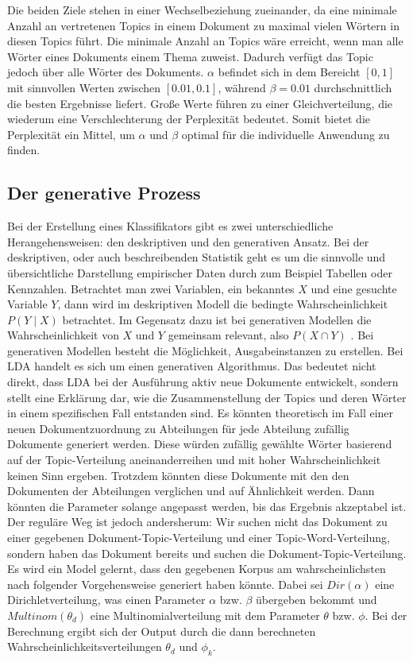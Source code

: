 \documentclass[german,version-2020-11]{uzl-thesis}
\begin{document}
Die beiden Ziele stehen in einer Wechselbeziehung zueinander, da eine minimale Anzahl an vertretenen Topics in einem Dokument zu maximal vielen Wörtern in diesen Topics führt. Die minimale Anzahl an Topics wäre erreicht, wenn man alle Wörter eines Dokuments einem Thema zuweist. Dadurch verfügt das Topic jedoch über alle Wörter des Dokuments. $\alpha$ befindet sich in dem Bereicht $[0,1]$ mit sinnvollen Werten zwischen $[0.01, 0.1]$, während $\beta =0.01$ durchschnittlich die besten Ergebnisse liefert. Große Werte führen zu einer Gleichverteilung, die wiederum eine Verschlechterung der Perplexität bedeutet. Somit bietet die Perplexität ein Mittel, um $\alpha$ und $\beta$ optimal für die individuelle Anwendung zu finden. \\



\subsection{Der generative Prozess} 
Bei der Erstellung eines Klassifikators gibt es zwei unterschiedliche Herangehensweisen: den deskriptiven und den generativen Ansatz. Bei der deskriptiven, oder auch beschreibenden Statistik geht es um die sinnvolle und übersichtliche Darstellung empirischer Daten durch zum Beispiel Tabellen oder Kennzahlen. Betrachtet man zwei Variablen, ein bekanntes $X$ und eine gesuchte Variable $Y$, dann wird im deskriptiven Modell die bedingte Wahrscheinlichkeit $P(Y \mid X)$ betrachtet. Im Gegensatz dazu ist bei generativen Modellen die Wahrscheinlichkeit von $X$ und $Y$ gemeinsam relevant, also $P(X \cap Y)$ . Bei generativen Modellen besteht die Möglichkeit, Ausgabeinstanzen zu erstellen. Bei LDA handelt es sich um einen generativen Algorithmus. Das bedeutet nicht direkt, dass LDA bei der Ausführung aktiv neue Dokumente entwickelt, sondern stellt eine Erklärung dar, wie die Zusammenstellung der Topics und deren Wörter in einem spezifischen Fall entstanden sind. Es könnten theoretisch im Fall einer neuen Dokumentzuordnung zu Abteilungen für jede Abteilung zufällig Dokumente generiert werden. Diese würden zufällig gewählte Wörter basierend auf der Topic-Verteilung aneinanderreihen und mit hoher Wahrscheinlichkeit keinen Sinn ergeben. Trotzdem könnten diese Dokumente mit den den Dokumenten der Abteilungen verglichen und auf Ähnlichkeit werden. Dann könnten die Parameter solange angepasst werden, bis das Ergebnis akzeptabel ist. Der reguläre Weg ist jedoch andersherum: Wir suchen nicht das Dokument zu einer gegebenen Dokument-Topic-Verteilung und einer Topic-Word-Verteilung, sondern haben das Dokument bereits und suchen die Dokument-Topic-Verteilung. Es wird ein Model gelernt, dass den gegebenen Korpus am wahrscheinlichsten nach folgender Vorgehensweise generiert haben könnte. Dabei sei $Dir(\alpha)$ eine Dirichletverteilung, was einen Parameter $\alpha$ bzw. $\beta$ übergeben bekommt und $Multinom(\theta_d)$ eine Multinomialverteilung mit dem Parameter $\theta$ bzw. $\phi$. Bei der Berechnung ergibt sich der Output durch die dann berechneten Wahrscheinlichkeitsverteilungen $\theta_d$ und $\phi_k$.
\end{document}
